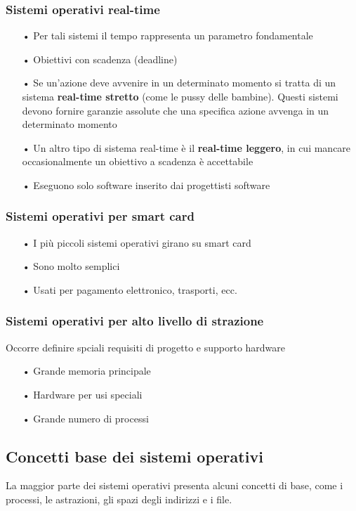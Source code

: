 \documentclass{article}
\begin{document}
\subsubsection{Sistemi operativi real-time}
\begin{enumerate}
   \item[•] Per tali sistemi il tempo rappresenta un parametro fondamentale
   \item[•] Obiettivi con scadenza (deadline)
   \item[•] Se un'azione deve avvenire in un determinato momento si tratta di un sistema 
      \textbf{real-time stretto} (come le pussy delle bambine). Questi sistemi devono fornire garanzie assolute che una specifica azione 
      avvenga in un determinato momento 
   \item[•] Un altro tipo di sistema real-time è il \textbf{real-time leggero}, in cui mancare occasionalmente un obiettivo a scadenza è accettabile
   \item[•] Eseguono solo software inserito dai progettisti software
\end{enumerate}

\subsubsection{Sistemi operativi per smart card}
\begin{enumerate}
   \item[•] I più piccoli sistemi operativi girano su smart card
   \item[•] Sono molto semplici 
   \item[•] Usati per pagamento elettronico, trasporti, ecc.
\end{enumerate}

\subsubsection{Sistemi operativi per alto livello di strazione}
Occorre definire spciali requisiti di progetto e supporto hardware
\begin{enumerate}
   \item[•] Grande memoria principale 
   \item[•] Hardware per usi speciali 
   \item[•] Grande numero di processi
\end{enumerate}
\newpage
\subsection{Concetti base dei sistemi operativi}
La maggior parte dei sistemi operativi presenta alcuni concetti di base, come i processi, le astrazioni, gli spazi degli indirizzi e i file.
\end{document}
